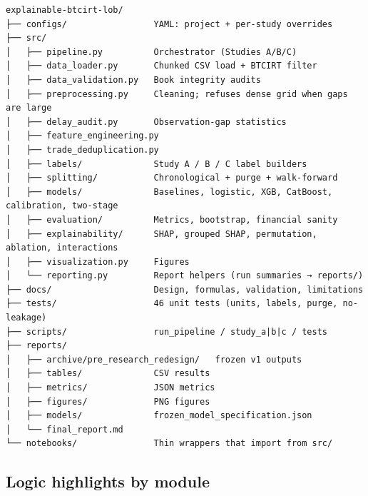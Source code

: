 \documentclass[11pt,a4paper]{article}
\begin{document}
\begin{verbatim}
explainable-btcirt-lob/
├── configs/                 YAML: project + per-study overrides
├── src/
│   ├── pipeline.py          Orchestrator (Studies A/B/C)
│   ├── data_loader.py       Chunked CSV load + BTCIRT filter
│   ├── data_validation.py   Book integrity audits
│   ├── preprocessing.py     Cleaning; refuses dense grid when gaps are large
│   ├── delay_audit.py       Observation-gap statistics
│   ├── feature_engineering.py
│   ├── trade_deduplication.py
│   ├── labels/              Study A / B / C label builders
│   ├── splitting/           Chronological + purge + walk-forward
│   ├── models/              Baselines, logistic, XGB, CatBoost, calibration, two-stage
│   ├── evaluation/          Metrics, bootstrap, financial sanity
│   ├── explainability/      SHAP, grouped SHAP, permutation, ablation, interactions
│   ├── visualization.py     Figures
│   └── reporting.py         Report helpers (run summaries → reports/)
├── docs/                    Design, formulas, validation, limitations
├── tests/                   46 unit tests (units, labels, purge, no-leakage)
├── scripts/                 run_pipeline / study_a|b|c / tests
├── reports/
│   ├── archive/pre_research_redesign/   frozen v1 outputs
│   ├── tables/              CSV results
│   ├── metrics/             JSON metrics
│   ├── figures/             PNG figures
│   ├── models/              frozen_model_specification.json
│   └── final_report.md
└── notebooks/               Thin wrappers that import from src/
\end{verbatim}

\subsection{Logic highlights by module}
\end{document}
